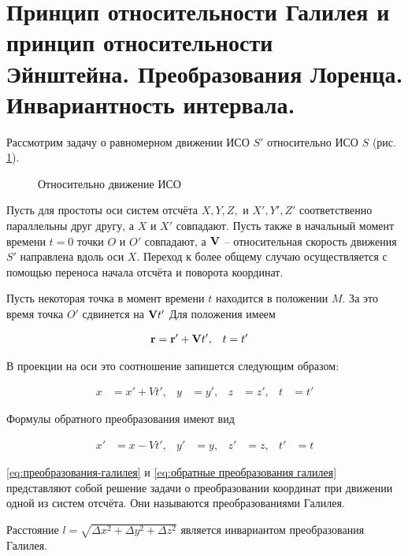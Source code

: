 \section{Принцип относительности Галилея и принцип относительности Эйнштейна. Преобразования Лоренца. Инвариантность интервала.}

Рассмотрим задачу о равномерном движении ИСО $S'$ относительно ИСО $S$ (рис. \ref{fig:исо}).

\begin{figure}[htbp]
    \centering
    
    \caption{Относительно движение ИСО}
    \label{fig:исо}
\end{figure}

Пусть для простоты оси систем отсчёта $X, Y, Z,$ и $X', Y', Z'$ соответственно параллельны друг другу, а $X$ и $X'$ совпадают. Пусть также в начальный момент времени $t = 0$ точки $O$ и $O'$ совпадают, а $\mathbf V$ -- относительная скорость движения $S'$ направлена вдоль оси $X$. Переход к более общему случаю осуществляется с помощью переноса начала отсчёта и поворота координат.

Пусть некоторая точка в момент времени $t$ находится в положении $M$. За это время точка $O'$ сдвинется на $\mathbf V t'$ Для положения имеем

\begin{align}
    \mathbf r &= \mathbf r' + \mathbf V t', & t &= t'
\end{align}

\noindent
В проекции на оси это соотношение запишется следующим образом:

\begin{align} \label{eq:преобразования-галилея}
    x &= x' + V t', & y &= y', & z &= z', & t &= t'
\end{align}

\noindent
Формулы обратного преобразования имеют вид

\begin{align} \label{eq:обратные преобразования галилея}
    x' &= x - V t', & y' &= y, & z' &= z, & t' &= t
\end{align}

\noindent
\eqref{eq:преобразования-галилея} и \eqref{eq:обратные преобразования галилея} представляют собой решение задачи о преобразовании координат при движении одной из систем отсчёта. Они называются преобразованиями Галилея.

\begin{note}
    Расстояние $l = \sqrt{\Delta x^2 + \Delta y^2 + \Delta z^2}$ является инвариантом преобразования Галилея.
\end{note}

